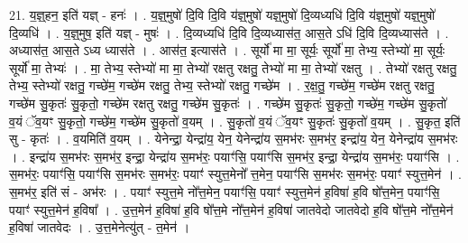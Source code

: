 \documentclass[17pt]{extarticle}
\begin{document}
21. य॒ज्ञ्॒हन॒ इति॑ यज्ञ् - हनः॑ । . य॒ज्ञ्॒मुषो॑ दि॒वि दि॒वि य॑ज्ञ्॒मुषो॑ यज्ञ्॒मुषो॑ दि॒व्यध्यधि॑ दि॒वि य॑ज्ञ्॒मुषो॑ यज्ञ्॒मुषो॑ दि॒व्यधि॑ । . य॒ज्ञ्॒मुष॒ इति॑ यज्ञ् - मुषः॑ । . दि॒व्यध्यधि॑ दि॒वि दि॒व्यध्यास॑त॒ आस॒ते ऽधि॑ दि॒वि दि॒व्यध्यास॑ते । . अध्यास॑त॒ आस॒ते ऽध्य ध्यास॑ते । . आस॑त॒ इत्यास॑ते । . सूर्यो॑ मा मा॒ सूर्यः॒ सूर्यो॑ मा॒ तेभ्य॒ स्तेभ्यो॑ मा॒ सूर्यः॒ सूर्यो॑ मा॒ तेभ्यः॑ । . मा॒ तेभ्य॒ स्तेभ्यो॑ मा मा॒ तेभ्यो॑ रक्षतु रक्षतु॒ तेभ्यो॑ मा मा॒ तेभ्यो॑ रक्षतु । . तेभ्यो॑ रक्षतु रक्षतु॒ तेभ्य॒ स्तेभ्यो॑ रक्षतु॒ गच्छे॑म॒ गच्छे॑म रक्षतु॒ तेभ्य॒ स्तेभ्यो॑ रक्षतु॒ गच्छे॑म । . र॒क्ष॒तु॒ गच्छे॑म॒ गच्छे॑म रक्षतु रक्षतु॒ गच्छे॑म सु॒कृतः॑ सु॒कृतो॒ गच्छे॑म रक्षतु रक्षतु॒ गच्छे॑म सु॒कृतः॑ । . गच्छे॑म सु॒कृतः॑ सु॒कृतो॒ गच्छे॑म॒ गच्छे॑म सु॒कृतो॑ व॒यं ॅव॒यꣳ सु॒कृतो॒ गच्छे॑म॒ गच्छे॑म सु॒कृतो॑ व॒यम् । . सु॒कृतो॑ व॒यं ॅव॒यꣳ सु॒कृतः॑ सु॒कृतो॑ व॒यम् । . सु॒कृत॒ इति॑ सु - कृतः॑ । . व॒यमिति॑ व॒यम् । . येनेन्द्रा॒ येन्द्रा॑य॒ येन॒ येनेन्द्रा॑य स॒मभ॑रः स॒मभ॑र॒ इन्द्रा॑य॒ येन॒ येनेन्द्रा॑य स॒मभ॑रः । . इन्द्रा॑य स॒मभ॑रः स॒मभ॑र॒ इन्द्रा॒ येन्द्रा॑य स॒मभ॑रः॒ पयाꣳ॑सि॒ पयाꣳ॑सि स॒मभ॑र॒ 
इन्द्रा॒ येन्द्रा॑य स॒मभ॑रः॒ पयाꣳ॑सि । . स॒मभ॑रः॒ पयाꣳ॑सि॒ पयाꣳ॑सि स॒मभ॑रः स॒मभ॑रः॒ पयाꣳ॑ स्युत्त॒मेनो᳚ त्त॒मेन॒ पयाꣳ॑सि स॒मभ॑रः स॒मभ॑रः॒ पयाꣳ॑ स्युत्त॒मेन॑ । . स॒मभ॑र॒ इति॑ सं - अभ॑रः । . पयाꣳ॑ स्युत्त॒मे नो᳚त्त॒मेन॒ पयाꣳ॑सि॒ पयाꣳ॑ स्युत्त॒मेन॑ ह॒विषा॑ ह॒वि षो᳚त्त॒मेन॒ पयाꣳ॑सि॒ पयाꣳ॑ स्युत्त॒मेन॑ ह॒विषा᳚ । . उ॒त्त॒मेन॑ ह॒विषा॑ ह॒वि षो᳚त्त॒मे नो᳚त्त॒मेन॑ ह॒विषा॑ जातवेदो जातवेदो ह॒वि षो᳚त्त॒मे नो᳚त्त॒मेन॑ ह॒विषा॑ जातवेदः । . उ॒त्त॒मेनेत्यु॑त् - त॒मेन॑ । \newline
\end{document}
